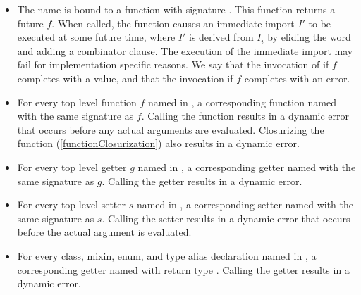 \documentclass[makeidx]{article}
\begin{document}
{\begin{itemize}
\item The name  is bound to
  a function with signature .
  This function returns a future $f$.
  When called, the function causes
  an immediate import $I'$ to be executed at some future time,
  where $I'$ is derived from $I_i$ by eliding the word \DEFERRED{}
  and adding a \HIDE{}  combinator clause.
  The execution of the immediate import may fail
  for implementation specific reasons.
  We say that the invocation of 
   if $f$ completes with a value,
  and that the invocation
   if $f$ completes with an error.
\item
  For every top level function $f$ named \id{} in
  ,
  a corresponding function named \id{} with the same signature as $f$.
  Calling the function results in a dynamic error that occurs before
  any actual arguments are evaluated.
  Closurizing the function
  (\ref{functionClosurization})
  also results in a dynamic error.
\item
  For every top level getter $g$ named \id{} in
  ,
  a corresponding getter named \id{} with the same signature as $g$.
  Calling the getter results in a dynamic error.
\item
  For every top level setter $s$ named \code{\id=} in
  ,
  a corresponding setter named \code{\id=} with the same signature as $s$.
  Calling the setter results in a dynamic error that occurs before
  the actual argument is evaluated.
\item
  For every class, mixin, enum, and type alias declaration named \id{} in
  ,
  a corresponding getter named \id{} with return type .
  Calling the getter results in a dynamic error.
\end{itemize}


}
\end{document}
